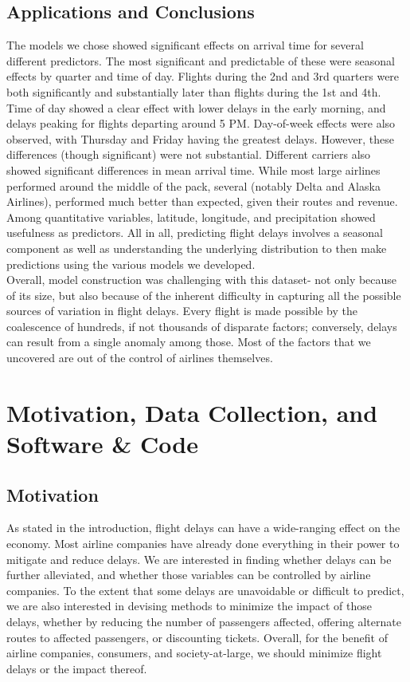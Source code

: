 \documentclass[12pt, a4paper, openany]{book}
\newcommand\tab[1][1cm]{\hspace*{#1}}
\begin{document}
	\section{Applications and Conclusions}

\tab The models we chose showed significant effects on arrival time for several different predictors. The most significant and predictable of these were seasonal effects by quarter and time of day. Flights during the 2nd and 3rd quarters were both significantly and substantially later than flights during the 1st and 4th. Time of day showed a clear effect with lower delays in the early morning, and delays peaking for flights departing around 5 PM. Day-of-week effects were also observed, with Thursday and Friday having the greatest delays. However, these differences (though significant) were not substantial. Different carriers also showed significant differences in mean arrival time. While most large airlines performed around the middle of the pack, several (notably Delta and Alaska Airlines), performed much better than expected, given their routes and revenue. Among quantitative variables, latitude, longitude, and precipitation showed usefulness as predictors. All in all, predicting flight delays involves a seasonal component as well as understanding the underlying distribution to then make predictions using the various models we developed.\\
\tab Overall, model construction was challenging with this dataset- not only because of its size, but also because of the inherent difficulty in capturing all the possible sources of variation in flight delays. Every flight is made possible by the coalescence of hundreds, if not thousands of disparate factors; conversely, delays can result from a single anomaly among those. Most of the factors that we uncovered are out of the control of airlines themselves. 
\chapter{Motivation, Data Collection, and Software \& Code}

	\section{Motivation}
	\tab As stated in the introduction, flight delays can have a wide-ranging effect on the economy. Most airline companies have already done everything in their power to mitigate and reduce delays. We are interested in finding whether delays can be further alleviated, and whether those variables can be controlled by airline companies. To the extent that some delays are unavoidable or difficult to predict, we are also interested in devising methods to minimize the impact of those delays, whether by reducing the number of passengers affected, offering alternate routes to affected passengers, or discounting tickets. Overall, for the benefit of airline companies, consumers, and society-at-large, we should minimize flight delays or the impact thereof. 
\end{document}
